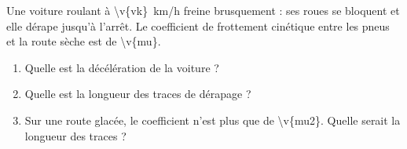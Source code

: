 Une voiture roulant à \qty{\v{vk}}{km/h} freine brusquement : ses roues se bloquent et elle dérape jusqu'à l'arrêt. Le coefficient de frottement cinétique entre les pneus et la route sèche est de \num{\v{mu}}.

\begin{enumerate}[label=\alph*)]
    \item Quelle est la décélération de la voiture ?
    \item Quelle est la longueur des traces de dérapage ?
    \item Sur une route glacée, le coefficient n'est plus que de \num{\v{mu2}}. Quelle serait la longueur des traces ?
\end{enumerate}
